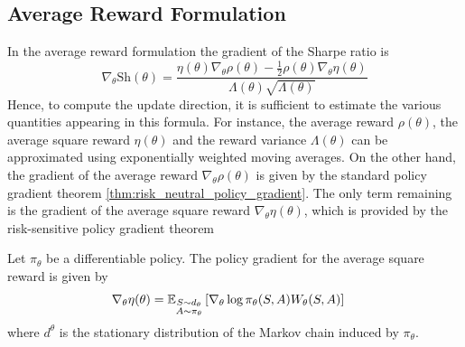 \subsection{Average Reward Formulation}
In the average reward formulation the gradient of the Sharpe ratio is
\begin{equation}
	\nabla_\theta \text{Sh}(\theta) = \frac{\eta(\theta) \nabla_\theta \rho(\theta) - \frac{1}{2} \rho(\theta) \nabla_\theta \eta(\theta)}{\Lambda(\theta) \sqrt{\Lambda(\theta)}}
\end{equation}
Hence, to compute the update direction, it is sufficient to estimate the various quantities appearing in this formula. For instance, the average reward $\rho(\theta)$, the average square reward $\eta(\theta)$ and the reward variance $\Lambda(\theta)$ can be approximated using exponentially weighted moving averages. On the other hand, the gradient of the average reward $\nabla_\theta \rho(\theta)$ is given by the standard policy gradient theorem \ref{thm:risk_neutral_policy_gradient}. The only term remaining is the gradient of the average square reward $\nabla_\theta \eta(\theta)$, which is provided by the risk-sensitive policy gradient theorem 
\begin{theorem}
	Let $\pi_\theta$ be a differentiable policy. The policy gradient for the average square reward is given by
	\begin{equation}\label{eq:policy_gradient_theorem_W}
		\begin{split}
			\nabla_\theta \eta(\theta) &= \E[\substack{S\sim d_\theta \\ 
			A \sim \pi_\theta}]{\nabla_\theta \log \pi_\theta(S,A) W_\theta(S,A)}
		\end{split}
	\end{equation}
	where $d^\theta$ is the stationary distribution of the Markov chain induced by $\pi_\theta$. 
\end{theorem}
